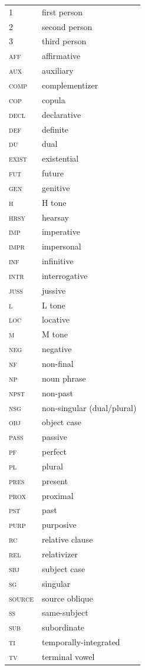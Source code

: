 \documentclass[output=paper]{langsci/langscibook}
\begin{document}
\begin{tabular}{ll}
1 & first person\\
2 & second person\\
3 & third person\\
\textsc{aff    } & affirmative\\
\textsc{aux    } & auxiliary\\
\textsc{comp    } & complementizer\\
\textsc{cop    } & copula\\
\textsc{decl    } & declarative\\
\textsc{def    } & definite\\
\textsc{du    } & dual\\
\textsc{exist    } & existential \\
\textsc{fut    } & future \\
\textsc{gen    } & genitive\\
\textsc{h    } & H tone\\
\textsc{hrsy    } & hearsay\\
\textsc{imp    } & imperative\\
\textsc{impr    } & impersonal\\
\textsc{inf    } & infinitive\\
\textsc{intr    } & interrogative\\
\textsc{juss    } & jussive\\
\textsc{l    } & L tone\\
\textsc{loc    } & locative\\
\textsc{m    } & M tone\\
\textsc{neg    } & negative\\
\textsc{nf     } & non-final\\
\textsc{np    } & noun phrase\\
\textsc{npst    } & non-past\\
\textsc{nsg    } & non-singular (dual/plural)\\
\textsc{obj    } & object case\\
\textsc{pass    } & passive \\
\textsc{pf    } & perfect\\
\textsc{pl    } & plural\\
\textsc{pres    } & present \\
\textsc{prox    } & proximal\\
\textsc{pst    } & past \\
\textsc{purp    } & purposive\\
\textsc{rc    } & relative clause\\
\textsc{rel    } & relativizer\\
\textsc{sbj    } & subject case\\
\textsc{sg    } & singular\\
\textsc{source  } & source oblique\\
\textsc{ss    } & same-subject\\
\textsc{sub    }& subordinate\\
\textsc{ti    } & temporally-integrated\\
\textsc{tv    }& terminal vowel\\
\end{tabular}


\printbibliography[heading=subbibliography,notkeyword=this]
\end{document}
